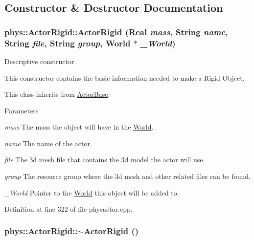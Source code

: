 \subsection{Constructor \& Destructor Documentation}
\hypertarget{classphys_1_1ActorRigid_ac42c05745d57eb5745de3f34e820b72d}{
\subsubsection[{ActorRigid}]{\setlength{\rightskip}{0pt plus 5cm}phys::ActorRigid::ActorRigid ({\bf Real} {\em mass}, \/  {\bf String} {\em name}, \/  {\bf String} {\em file}, \/  {\bf String} {\em group}, \/  {\bf World} $\ast$ {\em \_\-World})}}
\label{d8/d71/classphys_1_1ActorRigid_ac42c05745d57eb5745de3f34e820b72d}


Descriptive constructor. 

This constructor contains the basic information needed to make a Rigid Object. \par
 This class inherits from \hyperlink{classphys_1_1ActorBase}{ActorBase}. 
\begin{DoxyParams}{Parameters}
\item[{\em mass}]The mass the object will have in the \hyperlink{classphys_1_1World}{World}. \item[{\em name}]The name of the actor. \item[{\em file}]The 3d mesh file that contains the 3d model the actor will use. \item[{\em group}]The resource group where the 3d mesh and other related files can be found. \item[{\em \_\-World}]Pointer to the \hyperlink{classphys_1_1World}{World} this object will be added to. \end{DoxyParams}


Definition at line 322 of file physactor.cpp.

\hypertarget{classphys_1_1ActorRigid_ab317b5a2578157e54655a1aea8f4d058}{
\subsubsection[{$\sim$ActorRigid}]{\setlength{\rightskip}{0pt plus 5cm}phys::ActorRigid::$\sim$ActorRigid ()}}
\label{d8/d71/classphys_1_1ActorRigid_ab317b5a2578157e54655a1aea8f4d058}


